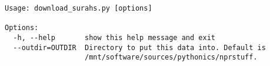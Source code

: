 \begin{verbatim}
Usage: download_surahs.py [options]

Options:
  -h, --help       show this help message and exit
  --outdir=OUTDIR  Directory to put this data into. Default is
                   /mnt/software/sources/pythonics/nprstuff.
\end{verbatim}